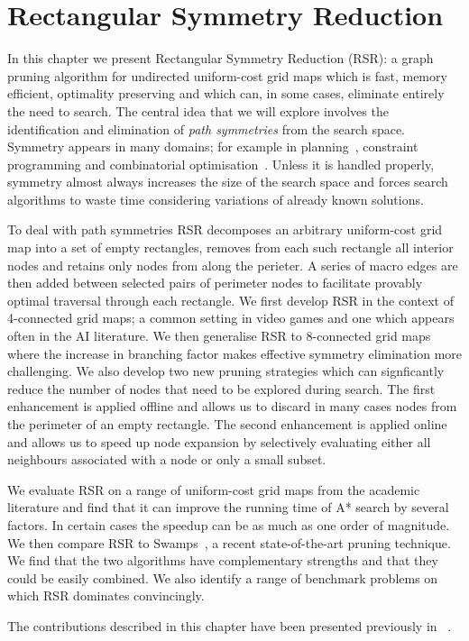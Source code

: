 \chapter{Rectangular Symmetry Reduction}
\label{cha::rsr} 
In this chapter we present Rectangular Symmetry Reduction (RSR): a graph pruning
algorithm for undirected uniform-cost grid maps which is fast, memory efficient,
optimality preserving and which can, in some cases, eliminate entirely the need
to search.  The central idea that we will explore involves the identification
and elimination of \emph{path symmetries} from the search space. 
Symmetry appears in many domains; for example in planning~\citep{fox99}, constraint 
programming \citep{walsh07} and combinatorial optimisation~\citep{fukunaga08}. 
Unless it is handled properly, symmetry almost always 
increases the size of the search space and forces search algorithms to waste time
considering variations of already known solutions.
\par
To deal with path symmetries RSR decomposes an arbitrary uniform-cost grid map
into a set of empty rectangles, removes from each such rectangle all interior
nodes and retains only nodes from along the perieter.  A series of macro edges
are then added between selected pairs of perimeter nodes to facilitate
provably optimal traversal through each rectangle.  We first develop RSR in
the context of 4-connected grid maps; a common setting in video games and one
which appears often in the AI literature.  We then generalise RSR to
8-connected grid maps where the increase in branching factor makes effective
symmetry elimination more challenging.  We also develop two new pruning
strategies which can signficantly reduce the number of nodes that need to be
explored during search.  The first enhancement is applied offline and allows
us to discard in many cases nodes from the perimeter of an empty rectangle.
The second enhancement is applied online and allows us to speed up node
expansion by selectively evaluating either all neighbours associated with a
node or only a small subset.

We evaluate RSR on a range of uniform-cost grid maps from the academic literature and find
that it can improve the running time of A* search by several factors. In certain cases the
speedup can be as much as one order of magnitude. We then compare RSR to 
Swamps~\citep{pochter10}, a recent state-of-the-art
pruning technique. We find that the two algorithms have complementary strengths and that they
could be easily combined. We also identify a range of benchmark problems on which RSR 
dominates convincingly.  
\par

The contributions described in this chapter have been presented previously in
~\citep{harabor10,harabor11a,harabor11c}.


